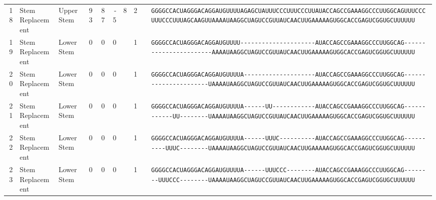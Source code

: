 \begin{tabular}{rllrrrrrcl}
 18 & Stem Replacement & Upper Stem & 93 & 87 & -5 & 8 & 2 &  &
 \color{ucsfblack}\verb|GGGGCCACUAGGGACAGGAU|\color{ucsfblue}\verb|GUUUUAGAGCUAUUUCCCUUUCCCUU|\color{ucsfpurple}\verb|AUACCAGCCGAAAGGCCCUUGGCAG|\color{ucsfblue}\verb|UUUCCCUUUCCCUUUAGCAAGUUAAAAU|\color{ucsfnavy}\verb|AAGGCUAGUCCGU|\color{ucsfteal}\verb|UAUCAACUUGAAAAAGUGGCACCGAGUCGGUGC|\color{ucsfblack}\verb|UUUUUU| \\

 19 & Stem Replacement & Lower Stem & 0 & 0 & 0 &  & 1 &  &
 \color{ucsfblack}\verb|GGGGCCACUAGGGACAGGAU|\color{ucsfblue}\verb|GUUUU---------------------|\color{ucsfpurple}\verb|AUACCAGCCGAAAGGCCCUUGGCAG|\color{ucsfblue}\verb|-----------------------AAAAU|\color{ucsfnavy}\verb|AAGGCUAGUCCGU|\color{ucsfteal}\verb|UAUCAACUUGAAAAAGUGGCACCGAGUCGGUGC|\color{ucsfblack}\verb|UUUUUU| \\

 20 & Stem Replacement & Lower Stem & 0 & 0 & 0 &  & 1 &  &
 \color{ucsfblack}\verb|GGGGCCACUAGGGACAGGAU|\color{ucsfblue}\verb|GUUUUA--------------------|\color{ucsfpurple}\verb|AUACCAGCCGAAAGGCCCUUGGCAG|\color{ucsfblue}\verb|----------------------UAAAAU|\color{ucsfnavy}\verb|AAGGCUAGUCCGU|\color{ucsfteal}\verb|UAUCAACUUGAAAAAGUGGCACCGAGUCGGUGC|\color{ucsfblack}\verb|UUUUUU| \\

 21 & Stem Replacement & Lower Stem & 0 & 0 & 0 &  & 1 &  &
 \color{ucsfblack}\verb|GGGGCCACUAGGGACAGGAU|\color{ucsfblue}\verb|GUUUUA------UU------------|\color{ucsfpurple}\verb|AUACCAGCCGAAAGGCCCUUGGCAG|\color{ucsfblue}\verb|------------UU--------UAAAAU|\color{ucsfnavy}\verb|AAGGCUAGUCCGU|\color{ucsfteal}\verb|UAUCAACUUGAAAAAGUGGCACCGAGUCGGUGC|\color{ucsfblack}\verb|UUUUUU| \\

 22 & Stem Replacement & Lower Stem & 0 & 0 & 0 &  & 1 &  &
 \color{ucsfblack}\verb|GGGGCCACUAGGGACAGGAU|\color{ucsfblue}\verb|GUUUUA------UUUC----------|\color{ucsfpurple}\verb|AUACCAGCCGAAAGGCCCUUGGCAG|\color{ucsfblue}\verb|----------UUUC--------UAAAAU|\color{ucsfnavy}\verb|AAGGCUAGUCCGU|\color{ucsfteal}\verb|UAUCAACUUGAAAAAGUGGCACCGAGUCGGUGC|\color{ucsfblack}\verb|UUUUUU| \\

 23 & Stem Replacement & Lower Stem & 0 & 0 & 0 &  & 1 &  &
 \color{ucsfblack}\verb|GGGGCCACUAGGGACAGGAU|\color{ucsfblue}\verb|GUUUUA------UUUCCC--------|\color{ucsfpurple}\verb|AUACCAGCCGAAAGGCCCUUGGCAG|\color{ucsfblue}\verb|--------UUUCCC--------UAAAAU|\color{ucsfnavy}\verb|AAGGCUAGUCCGU|\color{ucsfteal}\verb|UAUCAACUUGAAAAAGUGGCACCGAGUCGGUGC|\color{ucsfblack}\verb|UUUUUU| \\


\end{tabular}
